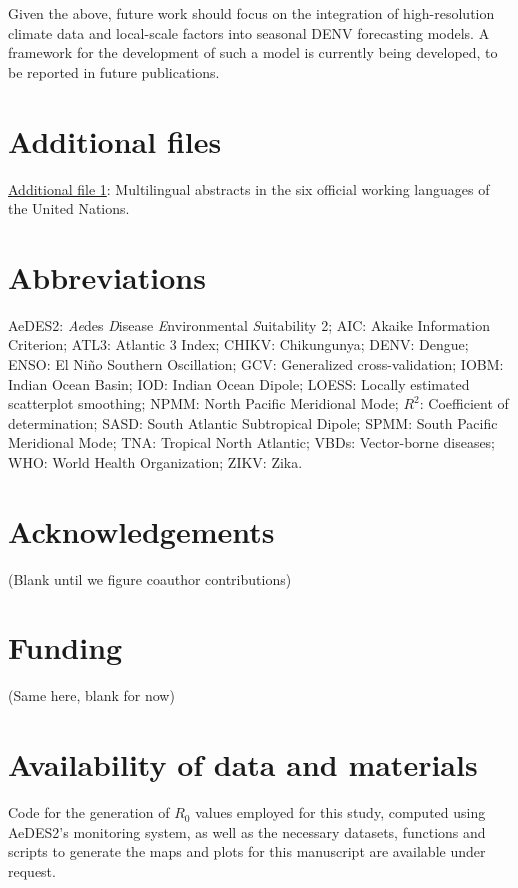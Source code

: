 \documentclass[10pt,twocolumn]{wlscirep}
\begin{document}
\noindent Given the above, future work should focus on the integration of high-resolution climate data and local-scale factors into seasonal DENV forecasting models. A framework for the development of such a model is currently being developed, to be reported in future publications.

\section*{Additional files} \label{sec-additional-files}

\href{multilingual_abstracts.pdf}{Additional file 1}: Multilingual abstracts in the six official working languages of the United Nations.

\section*{Abbreviations} \label{sec-abbreviations}
AeDES2: \textit{Ae}des \textit{D}isease \textit{E}nvironmental \textit{S}uitability 2; AIC: Akaike Information Criterion; ATL3: Atlantic 3 Index; CHIKV: Chikungunya; DENV: Dengue; ENSO: El Niño Southern Oscillation; GCV: Generalized cross-validation; IOBM: Indian Ocean Basin; IOD: Indian Ocean Dipole; LOESS: Locally estimated scatterplot smoothing; NPMM: North Pacific Meridional Mode; $R^2$: Coefficient of determination; SASD: South Atlantic Subtropical Dipole; SPMM: South Pacific Meridional Mode; TNA: Tropical North Atlantic; VBDs: Vector-borne diseases; WHO: World Health Organization; ZIKV: Zika.

\section*{Acknowledgements} \label{sec-acknowledgements}

(Blank until we figure coauthor contributions)

\section*{Funding} \label{sec-funding}

(Same here, blank for now)

\section*{Availability of data and materials} \label{sec-availability}
Code for the generation of $R_0$ values employed for this study, computed using AeDES2's monitoring system, as well as the necessary datasets, functions and scripts to generate the maps and plots for this manuscript are available under request.
\end{document}
